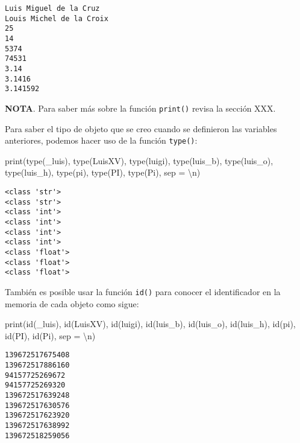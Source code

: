 \documentclass[
  letterpaper,
  DIV=11,
  numbers=noendperiod]{scrreprt}
\newenvironment{Shaded}{\begin{snugshade}}{\end{snugshade}}
\newcommand{\BuiltInTok}[1]{\textcolor[rgb]{0.00,0.23,0.31}{#1}}
\newcommand{\CharTok}[1]{\textcolor[rgb]{0.13,0.47,0.30}{#1}}
\newcommand{\NormalTok}[1]{\textcolor[rgb]{0.00,0.23,0.31}{#1}}
\newcommand{\OperatorTok}[1]{\textcolor[rgb]{0.37,0.37,0.37}{#1}}
\newcommand{\StringTok}[1]{\textcolor[rgb]{0.13,0.47,0.30}{#1}}
\begin{document}
\begin{verbatim}
Luis Miguel de la Cruz
Louis Michel de la Croix
25
14
5374
74531
3.14
3.1416
3.141592
\end{verbatim}

\textbf{NOTA}. Para saber más sobre la función \texttt{print()} revisa
la sección XXX.

Para saber el tipo de objeto que se creo cuando se definieron las
variables anteriores, podemos hacer uso de la función \texttt{type()}:

\begin{Shaded}
\begin{Highlighting}[]
\BuiltInTok{print}\NormalTok{(}\BuiltInTok{type}\NormalTok{(\_luis), }\BuiltInTok{type}\NormalTok{(LuisXV), }\BuiltInTok{type}\NormalTok{(luigi), }
      \BuiltInTok{type}\NormalTok{(luis\_b), }\BuiltInTok{type}\NormalTok{(luis\_o), }\BuiltInTok{type}\NormalTok{(luis\_h),}
      \BuiltInTok{type}\NormalTok{(pi), }\BuiltInTok{type}\NormalTok{(PI), }\BuiltInTok{type}\NormalTok{(Pi), sep }\OperatorTok{=} \StringTok{\textquotesingle{}}\CharTok{\textbackslash{}n}\StringTok{\textquotesingle{}}\NormalTok{)}
\end{Highlighting}
\end{Shaded}

\begin{verbatim}
<class 'str'>
<class 'str'>
<class 'int'>
<class 'int'>
<class 'int'>
<class 'int'>
<class 'float'>
<class 'float'>
<class 'float'>
\end{verbatim}

También es posible usar la función \texttt{id()} para conocer el
identificador en la memoria de cada objeto como sigue:

\begin{Shaded}
\begin{Highlighting}[]
\BuiltInTok{print}\NormalTok{(}\BuiltInTok{id}\NormalTok{(\_luis), }\BuiltInTok{id}\NormalTok{(LuisXV), }\BuiltInTok{id}\NormalTok{(luigi), }
      \BuiltInTok{id}\NormalTok{(luis\_b), }\BuiltInTok{id}\NormalTok{(luis\_o), }\BuiltInTok{id}\NormalTok{(luis\_h),}
      \BuiltInTok{id}\NormalTok{(pi), }\BuiltInTok{id}\NormalTok{(PI), }\BuiltInTok{id}\NormalTok{(Pi), sep }\OperatorTok{=} \StringTok{\textquotesingle{}}\CharTok{\textbackslash{}n}\StringTok{\textquotesingle{}}\NormalTok{)}
\end{Highlighting}
\end{Shaded}

\begin{verbatim}
139672517675408
139672517886160
94157725269672
94157725269320
139672517639248
139672517630576
139672517623920
139672517638992
139672518259056
\end{verbatim}
\end{document}
